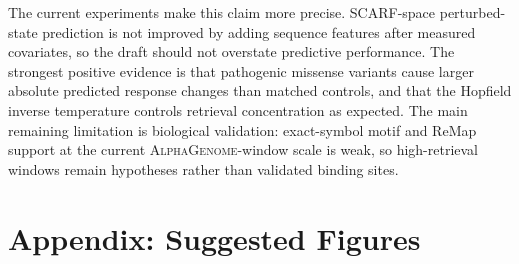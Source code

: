 \documentclass[11pt]{article}
\newcommand{\ag}{\textsc{AlphaGenome}}
\newcommand{\scarf}{\textsc{SCARF}}
\begin{document}
The current experiments make this claim more precise. \scarf-space perturbed-state prediction is not improved by adding sequence features after measured covariates, so the draft should not overstate predictive performance. The strongest positive evidence is that pathogenic missense variants cause larger absolute predicted response changes than matched controls, and that the Hopfield inverse temperature controls retrieval concentration as expected. The main remaining limitation is biological validation: exact-symbol motif and ReMap support at the current \ag-window scale is weak, so high-retrieval windows remain hypotheses rather than validated binding sites.

\clearpage
\appendix

\section{Appendix: Suggested Figures}
\end{document}
